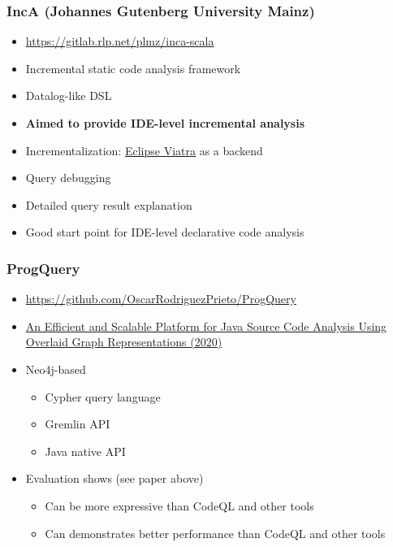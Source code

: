 \documentclass[xcolor=table,aspectratio=169]{beamer}
\begin{document}
\begin{frame}[fragile]
  \frametitle{IncA (Johannes Gutenberg University Mainz)} 
  \begin{minipage}[t]{0.55\textwidth}
  \begin{itemize}
    \item \url{https://gitlab.rlp.net/plmz/inca-scala}
    \item Incremental static code analysis framework
    \item Datalog-like DSL
    \item \textbf{Aimed to provide IDE-level incremental analysis}
  \end{itemize}
\end{minipage}
\pause
\begin{minipage}[t]{0.43\textwidth}
  \begin{itemize}
    \item[\faPlus] Incrementalization: \href{https://www.eclipse.org/viatra/documentation/}{Eclipse Viatra} as a backend   
    \item[\faGears] Query debugging
    \item[\faGears] Detailed query result explanation
  \end{itemize}
\pause
\vspace{30pt}
  \begin{itemize}
    \item Good start point for IDE-level declarative code analysis
  \end{itemize}
\end{minipage}
\end{frame}

\begin{frame}[fragile]
  \frametitle{ProgQuery}
  \begin{itemize}
    \item \url{https://github.com/OscarRodriguezPrieto/ProgQuery}
    \item \href{https://ieeexplore.ieee.org/stamp/stamp.jsp?tp=&arnumber=9064792}{An Efficient and Scalable Platform for Java Source Code Analysis Using Overlaid Graph Representations (2020)}
    \item Neo4j-based
    \begin{itemize}
      \item Cypher query language
      \item Gremlin API
      \item Java native API
    \end{itemize}
    \item Evaluation shows (see paper above)
    \begin{itemize}
      \item Can be more expressive than CodeQL and other tools
      \item Can demonstrates better performance than CodeQL and other tools
    \end{itemize} 
  \end{itemize}
\end{frame}
\end{document}
